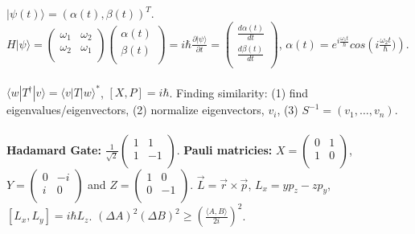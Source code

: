 \\
\\
$|\psi(t) \rangle= (\alpha(t), \beta(t))^T$.
$H |\psi \rangle= 
\left(
\begin{array}{cc}
\omega_1 & \omega_2 \\
\omega_2 & \omega_1 \\
\end{array} 
\right)
\left(
\begin{array}{c}
\alpha(t) \\
\beta(t) \\
\end{array} 
\right)=
i \hbar {\frac {\partial |\psi \rangle} {\partial t}} = 
\left(
\begin{array}{c}
{\frac {d\alpha(t)} {dt}} \\
{\frac {d\beta(t)} {dt}} \\
\end{array} 
\right)$, 
$ \alpha(t)= e^{i{\frac {\omega_1 t} {\hbar}}} cos({i{\frac {\omega_2 t} {\hbar}})})$.
\\
\\
$ \langle w | T^{\dagger} | v \rangle=  \langle v|T|w \rangle^*$, $[X,P]=i \hbar$.  Finding similarity:  
(1) find eigenvalues/eigenvectors, (2) normalize eigenvectors, $v_i$, 
(3) $S^{-1}= (v_1, \ldots, v_n)$.
\\
\\
{\bf Hadamard Gate: }
$
{\frac 1 {\sqrt 2}}
\left(
\begin{array}{cc}
1 & 1 \\
1 & -1 \\
\end{array} 
\right)$.
{\bf Pauli matricies:}
$X=
\left(
\begin{array}{cc}
0 & 1 \\
1 & 0 \\
\end{array} 
\right)$,
$Y=
\left(
\begin{array}{cc}
0 & -i \\
i & 0 \\
\end{array} 
\right)
$ and
$Z=
\left(
\begin{array}{cc}
1 & 0 \\
0 & -1 \\
\end{array} 
\right)
$.
$
{\vec L}=
{\vec r} \times
{\vec p}
$, $L_x= yp_z-zp_y$, $[L_x , L_y]= i \hbar L_z$.  
$ (\Delta A)^2
(\Delta B)^2
\ge
({\frac { \langle A,B \rangle} {2i}})^2$.
\\

